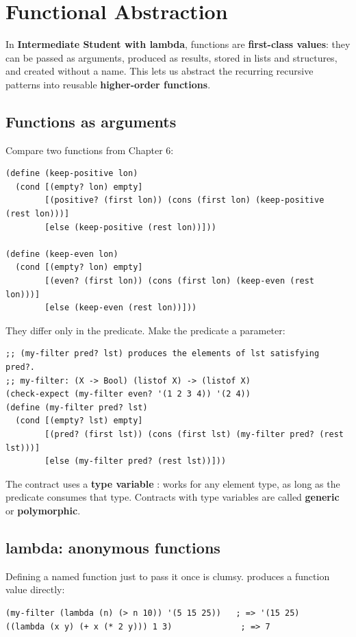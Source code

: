 \chapter{Functional Abstraction}\label{ch:abstraction}

In \textbf{Intermediate Student with lambda}, functions are
\textbf{first-class values}: they can be passed as arguments, produced as
results, stored in lists and structures, and created without a name. This
lets us abstract the recurring recursive patterns into reusable
\textbf{higher-order functions}.

\section{Functions as arguments}
Compare two functions from Chapter 6:
\begin{lstlisting}[style=racket]
(define (keep-positive lon)
  (cond [(empty? lon) empty]
        [(positive? (first lon)) (cons (first lon) (keep-positive (rest lon)))]
        [else (keep-positive (rest lon))]))

(define (keep-even lon)
  (cond [(empty? lon) empty]
        [(even? (first lon)) (cons (first lon) (keep-even (rest lon)))]
        [else (keep-even (rest lon))]))
\end{lstlisting}
They differ only in the predicate. Make the predicate a parameter:

\begin{lstlisting}[style=racket]
;; (my-filter pred? lst) produces the elements of lst satisfying pred?.
;; my-filter: (X -> Bool) (listof X) -> (listof X)
(check-expect (my-filter even? '(1 2 3 4)) '(2 4))
(define (my-filter pred? lst)
  (cond [(empty? lst) empty]
        [(pred? (first lst)) (cons (first lst) (my-filter pred? (rest lst)))]
        [else (my-filter pred? (rest lst))]))
\end{lstlisting}

The contract uses a \textbf{type variable} :  works
for any element type, as long as the predicate consumes that type. Contracts
with type variables are called \textbf{generic} or \textbf{polymorphic}.

\section{lambda: anonymous functions}
Defining a named function just to pass it once is clumsy.
 produces a function value directly:
\begin{lstlisting}[style=racket]
(my-filter (lambda (n) (> n 10)) '(5 15 25))   ; => '(15 25)
((lambda (x y) (+ x (* 2 y))) 1 3)              ; => 7
\end{lstlisting}

